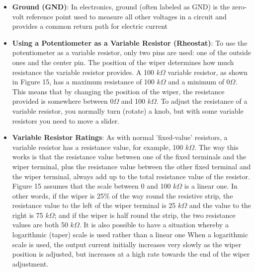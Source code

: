 \documentclass{report}
\begin{document}
\begin{itemize}
            \bigbreak \noindent 
            Voltage is always a difference between two points. You cannot measure the voltage of just one single spot without a baseline.
            \bigbreak \noindent 
            Ground acts as the "zero line" or 0V.  If ground is 0V and another part of the circuit reads 12V, you know there is a 12-volt push between those two spots.
        \item \textbf{Ground (GND)}: In electronics, ground (often labeled as GND) is the zero-volt reference point used to measure all other voltages in a circuit and provides a common return path for electric current 
        \item \textbf{Using a Potentiometer as a Variable Resistor (Rheostat)}:  To use the potentiometer as a variable resistor, only two pins are used: one of the outside ones and the center pin. The position of the wiper determines how much resistance the variable resistor provides.
            \bigbreak \noindent 
            \bigbreak \noindent 
            A 100 $k\Omega $ variable resistor, as shown in Figure 15, has a maximum resistance of 100 $k\Omega $ and a minimum of $0\Omega$. This means that by changing the position of the wiper, the resistance provided is somewhere between $0\Omega$ and 100 $k \Omega$.
            \bigbreak \noindent 
            To adjust the resistance of a variable resistor, you normally turn (rotate) a knob, but with some variable resistors you need to move a slider.
        \item \textbf{Variable Resistor Ratings}: As with normal 'fixed-value' resistors, a variable resistor has a resistance value, for example, 100 $k\Omega$. The way this works is that the resistance value between one of the fixed terminals and the wiper terminal, plus the resistance value between the other fixed terminal and the wiper terminal, always add up to the total resistance value of the resistor.
            \bigbreak \noindent 
            Figure 15 assumes that the scale between 0 and 100 $k\Omega$ is a linear one. In other words, if the wiper is 25\% of the way round the resistive strip, the resistance value to the left of the wiper terminal is 25 $k\Omega$ and the value to the right is 75 $k\Omega $; and if the wiper is half round the strip, the two resistance values are both 50 $k\Omega$.
            \bigbreak \noindent 
            It is also possible to have a situation whereby a logarithmic (taper) scale is used rather than a linear one
            \bigbreak \noindent 
            When a logarithmic scale is used, the output current initially increases very slowly as the wiper position is adjusted, but increases at a high rate towards the end of the wiper adjustment.

\end{itemize}
\end{document}
